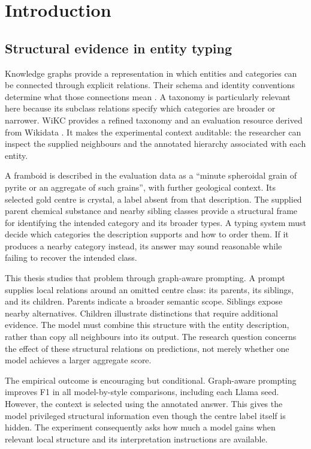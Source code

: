 \chapter{Introduction}

\FloatBarrier

\section{Structural evidence in entity typing}

Knowledge graphs provide a representation in which entities and categories can be connected through explicit relations. Their schema and identity conventions determine what those connections mean \citep{hogan2021}. A taxonomy is particularly relevant here because its subclass relations specify which categories are broader or narrower. WiKC provides a refined taxonomy and an evaluation resource derived from Wikidata \citep{peng2024}. It makes the experimental context auditable: the researcher can inspect the supplied neighbours and the annotated hierarchy associated with each entity.


A framboid is described in the evaluation data as a “minute spheroidal grain of pyrite or an aggregate of such grains”, with further geological context. Its selected gold centre is crystal, a label absent from that description. The supplied parent chemical substance and nearby sibling classes provide a structural frame for identifying the intended category and its broader types. A typing system must decide which categories the description supports and how to order them. If it produces a nearby category instead, its answer may sound reasonable while failing to recover the intended class.


This thesis studies that problem through graph-aware prompting. A prompt supplies local relations around an omitted centre class: its parents, its siblings, and its children. Parents indicate a broader semantic scope. Siblings expose nearby alternatives. Children illustrate distinctions that require additional evidence. The model must combine this structure with the entity description, rather than copy all neighbours into its output. The research question concerns the effect of these structural relations on predictions, not merely whether one model achieves a larger aggregate score.


The empirical outcome is encouraging but conditional. Graph-aware prompting improves F1 in all model-by-style comparisons, including each Llama seed. However, the context is selected using the annotated answer. This gives the model privileged structural information even though the centre label itself is hidden. The experiment consequently asks how much a model gains when relevant local structure and its interpretation instructions are available.


